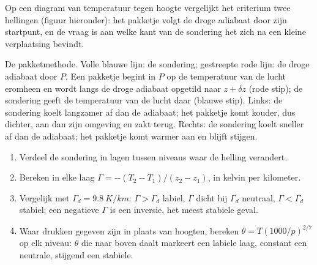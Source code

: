Op een diagram van temperatuur tegen hoogte vergelijkt het criterium twee hellingen (figuur hieronder): het pakketje volgt de droge adiabaat door zijn startpunt, en de vraag is aan welke kant van de sondering het zich na een kleine verplaatsing bevindt.

\begin{omfigure}

{\small De pakketmethode. Volle blauwe lijn: de sondering; gestreepte rode lijn: de droge adiabaat door $P$. Een pakketje begint in $P$ op de temperatuur van de lucht eromheen en wordt langs de droge adiabaat opgetild naar $z + \delta z$ (rode stip); de sondering geeft de temperatuur van de lucht daar (blauwe stip). Links: de sondering koelt langzamer af dan de adiabaat; het pakketje komt kouder, dus dichter, aan dan zijn omgeving en zakt terug. Rechts: de sondering koelt sneller af dan de adiabaat; het pakketje komt warmer aan en blijft stijgen.}
\label{fig:b1:fluid-envelopes-structure:parcel}
\end{omfigure}

\begin{method}\label{met:b1:fluid-envelopes-structure:sounding}
\begin{enumerate}
  \item Verdeel de sondering in lagen tussen niveaus waar de helling verandert.
  \item Bereken in elke laag $\Gamma = -(T_2 - T_1)/(z_2 - z_1)$, in kelvin per kilometer.
  \item Vergelijk met $\Gamma_d = \qty{9.8}{K/km}$: $\Gamma > \Gamma_d$ labiel, $\Gamma$ dicht bij $\Gamma_d$ neutraal, $\Gamma < \Gamma_d$ stabiel; een negatieve $\Gamma$ is een inversie, het meest stabiele geval.
  \item Waar drukken gegeven zijn in plaats van hoogten, bereken $\theta =
        T(1000/p)^{2/7}$ op elk niveau: $\theta$ die naar boven daalt markeert een labiele laag, constant een neutrale, stijgend een stabiele.
\end{enumerate}
\end{method}

